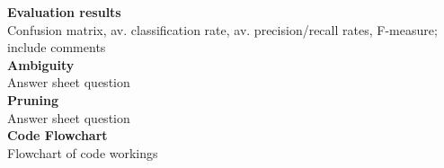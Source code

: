 \documentclass[12pt]{article}
\begin{document}
{\bf Evaluation results} \\
Confusion matrix, av. classification rate, av. precision/recall rates, F-measure; include comments \\

{\bf Ambiguity} \\
Answer sheet question \\

{\bf Pruning} \\
Answer sheet question\\

{\bf Code Flowchart} \\
Flowchart of code workings\\
\end{document}
